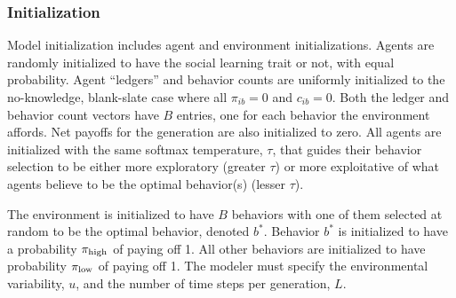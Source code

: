 \documentclass[letterpaper,11.5pt]{scrartcl}
\begin{document}
\subsubsection{Initialization}

Model initialization includes agent and environment initializations. Agents are
randomly initialized to have the social learning trait or not, with equal 
probability. Agent ``ledgers'' and behavior counts 
are uniformly initialized to the no-knowledge,
blank-slate case where all $\pi_{ib} = 0$ and $c_{ib} = 0$. Both the 
ledger and behavior count vectors have $B$ entries, one for each
behavior the environment affords. Net payoffs for
the generation are also initialized to zero. All agents are initialized with
the same softmax temperature, $\tau$, that guides their behavior selection 
to be either more exploratory (greater $\tau$) or more exploitative of
what agents believe to be the optimal behavior(s) (lesser $\tau$).

The environment is initialized to have $B$ behaviors with one of them selected
at random to be the optimal behavior, denoted $b^*$. Behavior $b^*$ is 
initialized to have a probability $\pi_{\mathrm{high}}$ of paying off 1. All other behaviors
are initialized to have probability $\pi_{\mathrm{low}}$ of paying off 1. The modeler must
specify the environmental variability, $u$, and the number of time steps per 
generation, $L$. 
\end{document}
